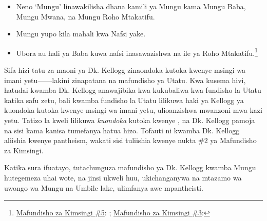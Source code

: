 \begin{itemize}
    \item Neno ‘Mungu’ linawakilisha dhana kamili ya Mungu kama Mungu Baba, Mungu Mwana, na Mungu Roho Mtakatifu.
    \item Mungu yupo kila mahali kwa Nafsi yake.
    \item Ubora au hali ya Baba kuwa nafsi inasawazishwa na ile ya Roho Mtakatifu.\footnote{\href{https://www.adventist.org/wp-content/uploads/2020/06/ADV-28Beliefs2020.pdf}{Mafundisho za Kimsingi \#5}: ; \href{https://www.adventist.org/wp-content/uploads/2020/06/ADV-28Beliefs2020.pdf}{Mafundisho za Kimsingi \#3}: }
\end{itemize}

Sifa hizi tatu za maoni ya Dk. Kellogg zinaondoka kutoka kwenye msingi wa imani yetu——lakini zinapatana na mafundisho ya Utatu. Kwa kusema hivi, hatudai kwamba Dk. Kellogg anawajibika kwa kukubaliwa kwa fundisho la Utatu katika safu zetu, bali kwamba fundisho la Utatu lilikuwa haki ya Kellogg ya kuondoka kutoka kwenye msingi wa imani yetu, ulioanzishwa mwanzoni mwa kazi yetu. Tatizo la kweli lilikuwa \textit{kuondoka} kutoka kwenye , na Dk. Kellogg pamoja na sisi kama kanisa tumefanya hatua hizo. Tofauti ni kwamba Dk. Kellogg aliishia kwenye pantheism, wakati sisi tuliishia kwenye nukta \#2 ya Mafundisho za Kimsingi.

Katika sura ifuatayo, tutachunguza mafundisho ya Dk. Kellogg kwamba Mungu hutegemeza uhai wote, na jinsi ukweli huu, ukichanganywa na mtazamo wa uwongo wa Mungu na Umbile lake, ulimfanya awe mpantheisti.


